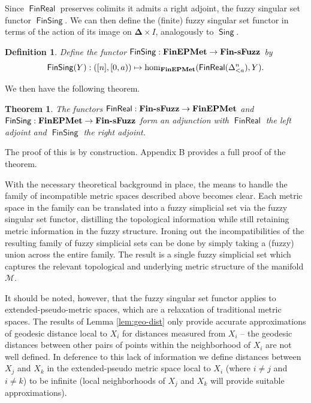 \documentclass[12pt]{article}
\newtheorem{thm}{Theorem}
\newtheorem{defn}{Definition}
\DeclareMathOperator{\Sing}{\mathsf{Sing}}
\DeclareMathOperator{\FinReal}{\mathsf{FinReal}}
\DeclareMathOperator{\FinSing}{\mathsf{FinSing}}
\begin{document}
Since $\FinReal$ preserves colimits it admits a right adjoint, the fuzzy singular set functor $\FinSing$. We can then define the (finite) fuzzy singular set functor in terms of the action of its image on $\boldsymbol\Delta \times I$, analogously to $\Sing$.

\begin{defn}
Define the functor $\FinSing:\mathbf{FinEPMet}\to\text{\rm \bf Fin-sFuzz}$ by
\[
\FinSing(Y): ([n], [0,a)) \mapsto \hom_{\text{\bf FinEPMet}}(\FinReal(\Delta^n_{<a}), Y).
\]
\end{defn}

We then have the following theorem.
\begin{thm}\label{thm:adjunction}
The functors $\FinReal:\text{\rm \bf Fin-sFuzz}\to\mathbf{FinEPMet}$ and $\FinSing:\mathbf{FinEPMet}\to \text{\rm \bf Fin-sFuzz}$ form an adjunction with $\FinReal$ the left adjoint and $\FinSing$ the right adjoint.
\end{thm}

The proof of this is by construction. Appendix B provides a full proof of the theorem.

With the necessary theoretical background in place, the means to handle the family of incompatible metric spaces described above becomes clear. Each metric space in the family can be translated into a fuzzy simplicial set via the fuzzy singular set functor, distilling the topological information while still retaining metric information in the fuzzy structure. Ironing out the incompatibilities of the resulting family of fuzzy simplicial sets can be done by simply taking a (fuzzy) union across the entire family. The result is a single fuzzy simplicial set which captures the relevant topological and underlying metric structure of the manifold $\mathcal{M}$.

It should be noted, however, that the fuzzy singular set functor applies to extended-pseudo-metric spaces, which are a relaxation of traditional metric spaces. The results of Lemma \ref{lem:geo-dist} only provide accurate approximations of geodesic distance local to $X_i$ for distances measured from $X_i$ -- the geodesic distances between other pairs of points within the neighborhood of $X_i$ are not well defined. In deference to this lack of information we define distances between $X_j$ and $X_k$ in the extended-pseudo metric space local to $X_i$ (where $i\neq j$ and $i\neq k$) to be infinite (local neighborhoods of $X_j$ and $X_k$ will provide suitable approximations).
\end{document}
